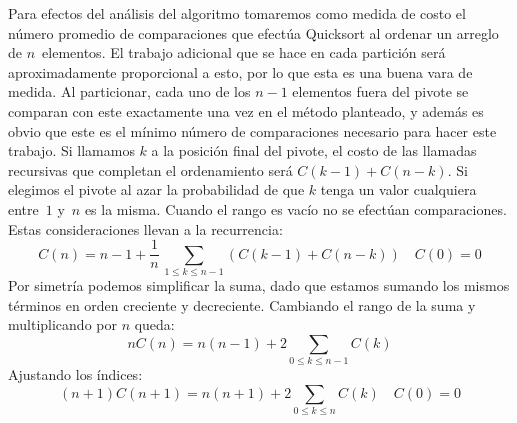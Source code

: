  Para efectos del análisis del algoritmo
  tomaremos como medida de costo el número promedio de comparaciones
  que efectúa Quicksort al ordenar un arreglo de \(n\)~elementos.
  El trabajo adicional que se hace en cada partición
  será aproximadamente proporcional a esto,
  por lo que esta es una buena vara de medida.
  Al particionar,
  cada uno de los \(n - 1\) elementos fuera del pivote
  se comparan con este exactamente una vez en el método planteado,
  y además es obvio que este es el mínimo número de comparaciones necesario
  para hacer este trabajo.
  Si llamamos \(k\) a la posición final del pivote,
  el costo de las llamadas recursivas que completan el ordenamiento
  será \(C(k - 1) + C(n - k)\).
  Si elegimos el pivote al azar
  la probabilidad de que \(k\) tenga un valor cualquiera entre~\(1\)
  y~\(n\) es la misma.
  Cuando el rango es vacío no se efectúan comparaciones.
  Estas consideraciones llevan a la recurrencia:
  \begin{equation*}
    C(n)
       =  n - 1 +
	   \frac{1}{n} \, \sum_{1 \le k \le n - 1}
	      \left(C(k - 1) + C(n - k)\right) \quad C(0)  = 0
  \end{equation*}
  Por simetría podemos simplificar la suma,
  dado que estamos sumando los mismos términos
  en orden creciente y decreciente.
  Cambiando el rango de la suma y multiplicando por \(n\) queda:
  \begin{equation*}
    n C(n)
      = n (n - 1) + 2 \sum_{0 \le k \le n - 1} C(k)
  \end{equation*}
  Ajustando los índices:
  \begin{equation*}
    (n + 1) C(n + 1)
      = n (n + 1) + 2 \sum_{0 \le k \le n} C(k) \quad C(0) = 0
  \end{equation*}

